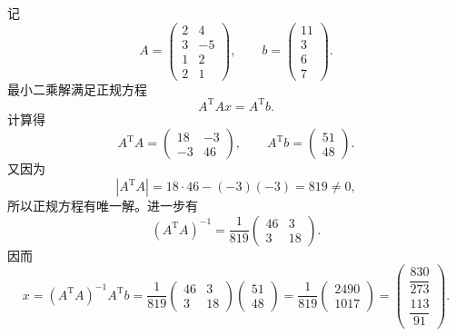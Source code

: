 \documentclass[11pt, a4paper]{ctexart}
\begin{document}
\begin{solution}
    记
    \[
        A =
        \begin{pmatrix}
            2 & 4 \\
            3 & -5 \\
            1 & 2 \\
            2 & 1
        \end{pmatrix},
        \qquad
        b =
        \begin{pmatrix}
            11 \\
            3 \\
            6 \\
            7
        \end{pmatrix}.
    \]
    最小二乘解满足正规方程
    \[
        A^{\mathrm{T}} A x = A^{\mathrm{T}} b.
    \]
    计算得
    \[
        A^{\mathrm{T}}A =
        \begin{pmatrix}
            18 & -3 \\
            -3 & 46
        \end{pmatrix},
        \qquad
        A^{\mathrm{T}}b =
        \begin{pmatrix}
            51 \\
            48
        \end{pmatrix}.
    \]
    又因为
    \[
        |A^{\mathrm{T}}A| = 18 \cdot 46 - (-3)(-3) = 819 \ne 0,
    \]
    所以正规方程有唯一解。进一步有
    \[
        (A^{\mathrm{T}}A)^{-1}
        =
        \frac{1}{819}
        \begin{pmatrix}
            46 & 3 \\
            3 & 18
        \end{pmatrix}.
    \]
    因而
    \[
        x
        =
        (A^{\mathrm{T}}A)^{-1}A^{\mathrm{T}}b
        =
        \frac{1}{819}
        \begin{pmatrix}
            46 & 3 \\
            3 & 18
        \end{pmatrix}
        \begin{pmatrix}
            51 \\
            48
        \end{pmatrix}
        =
        \frac{1}{819}
        \begin{pmatrix}
            2490 \\
            1017
        \end{pmatrix}
        =
        \begin{pmatrix}
            \dfrac{830}{273} \\
            \dfrac{113}{91}
        \end{pmatrix}.
    \]
\end{solution}
\end{document}
